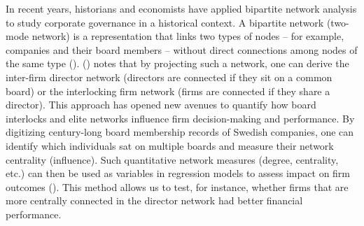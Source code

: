 \documentclass[
]{article}
\begin{document}
In recent years, historians and economists have applied bipartite
network analysis to study corporate governance in a historical context.
A bipartite network (two-mode network) is a representation that links
two types of nodes -- for example, companies and their board members --
without direct connections among nodes of the same type
().
()
notes that by projecting such a network, one can derive the inter-firm
director network (directors are connected if they sit on a common board)
or the interlocking firm network (firms are connected if they share a
director). This approach has opened new avenues to quantify how board
interlocks and elite networks influence firm decision-making and
performance\hspace{0pt}. By digitizing century-long board membership
records of Swedish companies\hspace{0pt}, one can identify which
individuals sat on multiple boards and measure their network centrality
(influence). Such quantitative network measures (degree, centrality,
etc.) can then be used as variables in regression models to assess
impact on firm outcomes
().
This method allows us to test, for instance, whether firms that are more
centrally connected in the director network had better financial
performance.
\end{document}
